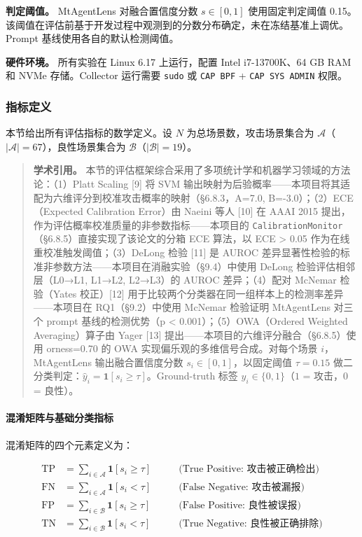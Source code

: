 \documentclass[a4paper]{ctexart}
\makeatletter
\renewcommand{\_}{%
  \ifmmode
    \nfss@text{\textunderscore}%
  \else
    \textunderscore\discretionary{}{}{}%
  \fi}
\makeatother
\begin{document}
\textbf{判定阈值。} MtAgentLens 对融合置信度分数 $s \in [0,1]$ 使用固定判定阈值 0.15。该阈值在评估前基于开发过程中观测到的分数分布确定，未在冻结基准上调优。Prompt 基线使用各自的默认检测阈值。


\textbf{硬件环境。} 所有实验在 Linux 6.17 上运行，配置 Intel i7-13700K、64 GB RAM 和 NVMe 存储。Collector 运行需要 \texttt{sudo} 或 \texttt{CAP\_BPF} + \texttt{CAP\_SYS\_ADMIN} 权限。


\subsubsection{指标定义}



本节给出所有评估指标的数学定义。设 $N$ 为总场景数，攻击场景集合为 $\mathcal{A}$（$|\mathcal{A}| = 67$），良性场景集合为 $\mathcal{B}$（$|\mathcal{B}| = 19$）。


\begin{quote}
\textbf{学术引用。} 本节的评估框架综合采用了多项统计学和机器学习领域的方法论：（1）Platt Scaling [9] 将 SVM 输出映射为后验概率——本项目将其适配为六维评分到校准攻击概率的映射（§6.8.3，A=7.0, B=-3.0）；（2）ECE（Expected Calibration Error）由 Naeini 等人 [10] 在 AAAI 2015 提出，作为评估概率校准质量的非参数指标——本项目的 \texttt{CalibrationMonitor}（§6.8.5）直接实现了该论文的分箱 ECE 算法，以 ECE > 0.05 作为在线重校准触发阈值；（3）DeLong 检验 [11] 是 AUROC 差异显著性检验的标准非参数方法——本项目在消融实验（§9.4）中使用 DeLong 检验评估相邻层（L0→L1, L1→L2, L2→L3）的 AUROC 差异；（4）配对 McNemar 检验（Yates 校正）[12] 用于比较两个分类器在同一组样本上的检测率差异——本项目在 RQ1（§9.2）中使用 McNemar 检验证明 MtAgentLens 对三个 prompt 基线的检测优势（p < 0.001）；（5）OWA（Ordered Weighted Averaging）算子由 Yager [13] 提出——本项目的六维评分融合（§6.8.5）使用 orness=0.70 的 OWA 实现偏乐观的多维信号合成。对每个场景 $i$，MtAgentLens 输出融合置信度分数 $s_i \in [0,1]$，以固定阈值 $\tau = 0.15$ 做二分类判定：$\hat{y}_i = \mathbf{1}[s_i \geq \tau]$。Ground-truth 标签 $y_i \in \{0,1\}$（$1$ = 攻击，$0$ = 良性）。

\end{quote}


\paragraph{混淆矩阵与基础分类指标}


混淆矩阵的四个元素定义为：


$$
\begin{aligned}
\text{TP} &= \sum_{i \in \mathcal{A}} \mathbf{1}[s_i \geq \tau] \qquad &\text{(True Positive: 攻击被正确检出)} \\
\text{FN} &= \sum_{i \in \mathcal{A}} \mathbf{1}[s_i < \tau] \qquad &\text{(False Negative: 攻击被漏报)} \\
\text{FP} &= \sum_{i \in \mathcal{B}} \mathbf{1}[s_i \geq \tau] \qquad &\text{(False Positive: 良性被误报)} \\
\text{TN} &= \sum_{i \in \mathcal{B}} \mathbf{1}[s_i < \tau] \qquad &\text{(True Negative: 良性被正确排除)}
\end{aligned}
$$
\end{document}
